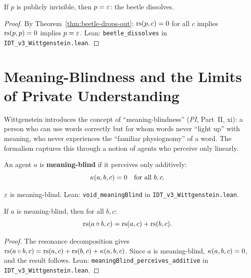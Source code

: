 \begin{theorem}
\label{thm:beetle-dissolves}
If $p$ is publicly invisible, then $p = \varepsilon$: the beetle dissolves.
\end{theorem}

\begin{proof}
By Theorem~\ref{thm:beetle-drops-out}: $\mathrm{rs}(p, c) = 0$ for all $c$ implies
$\mathrm{rs}(p, p) = 0$ implies $p = \varepsilon$.
Lean: \texttt{beetle\_dissolves} in \texttt{IDT\_v3\_Wittgenstein.lean}.
\end{proof}

\section{Meaning-Blindness and the Limits of Private Understanding}

Wittgenstein introduces the concept of ``meaning-blindness'' (\textit{PI},
Part~II, xi): a person who can use words correctly but for whom words never
``light up'' with meaning, who never experiences the ``familiar physiognomy''
of a word. The formalism captures this through a notion of agents who perceive
only linearly.

\begin{definition}
\label{def:meaning-blind}
An agent $a$ is \textbf{meaning-blind} if it perceives only additively:
\[
\kappa(a, b, c) = 0 \quad \text{for all } b, c.
\]
\end{definition}

\begin{theorem}
\label{thm:void-meaning-blind}
$\varepsilon$ is meaning-blind.
Lean: \texttt{void\_meaningBlind} in \texttt{IDT\_v3\_Wittgenstein.lean}.
\end{theorem}

\begin{theorem}
\label{thm:meaning-blind-additive}
If $a$ is meaning-blind, then for all $b, c$:
\[
\mathrm{rs}(a \circ b, c) = \mathrm{rs}(a, c) + \mathrm{rs}(b, c).
\]
\end{theorem}

\begin{proof}
The resonance decomposition gives $\mathrm{rs}(a \circ b, c) = \mathrm{rs}(a,c) + \mathrm{rs}(b,c)
+ \kappa(a,b,c)$. Since $a$ is meaning-blind, $\kappa(a,b,c) = 0$, and
the result follows.
Lean: \texttt{meaningBlind\_perceives\_additive} in
\texttt{IDT\_v3\_Wittgenstein.lean}.
\end{proof}

